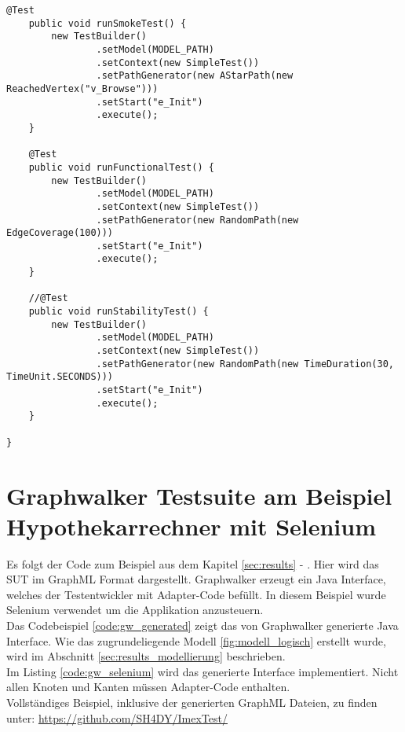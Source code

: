 \begin{lstlisting}[caption=SimpleTest.java, label=code:soap_graphwalker]
    @Test
    public void runSmokeTest() {
        new TestBuilder()
                .setModel(MODEL_PATH)
                .setContext(new SimpleTest())
                .setPathGenerator(new AStarPath(new ReachedVertex("v_Browse")))
                .setStart("e_Init")
                .execute();
    }

    @Test
    public void runFunctionalTest() {
        new TestBuilder()
                .setModel(MODEL_PATH)
                .setContext(new SimpleTest())
                .setPathGenerator(new RandomPath(new EdgeCoverage(100)))
                .setStart("e_Init")
                .execute();
    }

    //@Test
    public void runStabilityTest() {
        new TestBuilder()
                .setModel(MODEL_PATH)
                .setContext(new SimpleTest())
                .setPathGenerator(new RandomPath(new TimeDuration(30, TimeUnit.SECONDS)))
                .setStart("e_Init")
                .execute();
    }

}
\end{lstlisting}


\section{Graphwalker Testsuite am Beispiel Hypothekarrechner mit Selenium}
Es folgt der Code zum Beispiel aus dem Kapitel \ref{sec:results} - . Hier wird das \Gls{SUT} im GraphML Format dargestellt. Graphwalker erzeugt ein Java Interface, welches der Testentwickler mit Adapter-Code befüllt. In diesem Beispiel wurde Selenium verwendet um die Applikation anzusteuern.\\

Das Codebeispiel \ref{code:gw_generated} zeigt das von Graphwalker generierte Java Interface. Wie das zugrundeliegende Modell \ref{fig:modell_logisch} erstellt wurde, wird im Abschnitt \ref{sec:results_modellierung} beschrieben.\\

Im Listing \ref{code:gw_selenium} wird das generierte Interface implementiert. Nicht allen Knoten und Kanten müssen Adapter-Code enthalten.\\

Vollständiges Beispiel, inklusive der generierten GraphML Dateien, zu finden unter: \url{https://github.com/SH4DY/ImexTest/}

